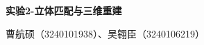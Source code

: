 \documentclass[UTF8,fontset=none,a4paper]{ctexart}
\begin{document}
{\color{ReportTeal}\bfseries\fontsize{14bp}{19bp}\selectfont 实验2-立体匹配与三维重建\par}
{\color{ReportInk}曹航硕（3240101938）、吴翱臣（3240106219）\par}





\end{document}
